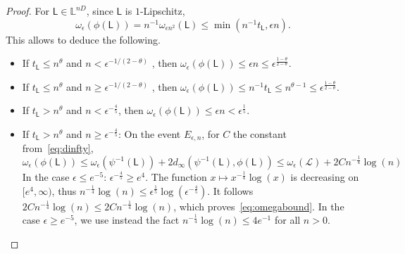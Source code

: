 \documentclass[11pt]{article}
\begin{document}
\begin{proof}
For $\mathsf{L} \in \mathbb{L}^{n D}$, since $\mathsf{L}$ is $1$-Lipschitz,
\begin{equation}
\label{eq:temp:omegastupidbound}
\omega_\epsilon(\phi(\mathsf{L}))=n^{-1}\omega_{ \epsilon n^2}(\mathsf{L})\leq\min (  n^{-1}t_{\mathsf{L}} ,\epsilon n ).
\end{equation}
This allows to deduce the following.
\begin{itemize}
\item If $t_{\mathsf{L}}\leq n^{\theta}$ and  $n< \epsilon^{-1/(2-\theta)}$ , then $ \omega_\epsilon(\phi(\mathsf{L}))\leq \epsilon n \leq  \epsilon^{ \frac{1-\theta}{2-\theta}  } $.
\item If $t_{\mathsf{L}}\leq n^{\theta}$ and  $n\geq \epsilon^{-1/(2-\theta)}$ , then $ \omega_\epsilon(\phi(\mathsf{L}))\leq n^{-1}t_{\mathsf{L}}\leq n^{\theta-1}\leq \epsilon^{ \frac{1-\theta}{2-\theta}  } $.
\item If $t_{\mathsf{L}}> n^{\theta}$ and $n< \epsilon^{-\frac{4}{5}}$,  then $ \omega_\epsilon(\phi(\mathsf{L}))\leq \epsilon n <\epsilon^\frac{1}{5}$.
\item If $t_{\mathsf{L}}> n^{\theta}$ and $n\geq \epsilon^{-\frac{4}{5}}$:
On the event $E_{\epsilon,n}$, for $C$ the constant from~\eqref{eq:dinfty},
\[
\omega_\epsilon(\phi(\mathsf{L}))\leq \omega_\epsilon(\psi^{-1}(\mathsf{L}))+2 d_\infty(\psi^{-1}(\mathsf{L}), \phi(\mathsf{L}) )
 \leq \omega_\epsilon(\mathcal{L})+
 2Cn^{-\frac{1}{4}}\log(n)
\]
In the case $\epsilon\leq e^{-5}$: $\epsilon^{-\frac{4}{5}}\geq e^4$. The function
 $x\mapsto x^{-\frac{1}{4}}\log(x)$ is decreasing on $[e^4,\infty)$, thus $n^{-\frac{1}{4}}\log(n)\leq \epsilon^{\frac{1}{5}} \log(\epsilon^{-\frac{4}{5}}) $. It follows
$2Cn^{-\frac{1}{4}}\log(n)\leq 2Cn^{-\frac{1}{4}}\log(n)$,
which proves~\eqref{eq:omegabound}. In the case $\epsilon \geq e^{-5}$, we use instead the fact $n^{-\frac{1}{4}}\log(n)\leq 4e^{-1}$ for all $n>0$. \qedhere
\end{itemize}
\end{proof}
\end{document}
